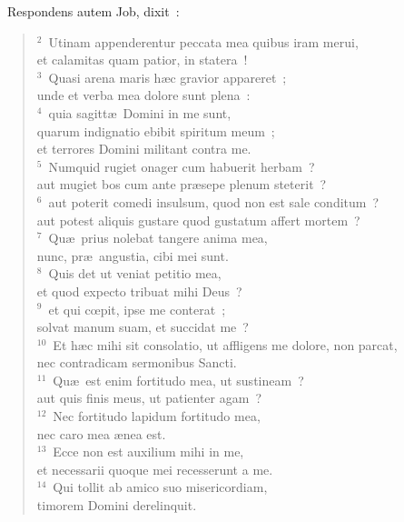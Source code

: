 ~\lettrine[lines=10,image=true,loversize=0.05,lraise=-0.03]{R}{}espondens autem Job, dixit~:
\begin{flushleft}\begin{verse}\vspace{6pt}${}^{2}$~Utinam appenderentur peccata mea quibus iram merui,\\ et calamitas quam patior, in statera~!\\
${}^{3}$~Quasi arena maris h\ae c gravior appareret~;\\ unde et verba mea dolore sunt plena~:\\
${}^{4}$~quia sagitt\ae\ Domini in me sunt,\\ quarum indignatio ebibit spiritum meum~;\\ et terrores Domini militant contra me.\\
${}^{5}$~Numquid rugiet onager cum habuerit herbam~?\\ aut mugiet bos cum ante pr\ae sepe plenum steterit~?\\
${}^{6}$~aut poterit comedi insulsum, quod non est sale conditum~?\\ aut potest aliquis gustare quod gustatum affert mortem~?\\
${}^{7}$~Qu\ae\ prius nolebat tangere anima mea,\\ nunc, pr\ae\ angustia, cibi mei sunt.\\
${}^{8}$~Quis det ut veniat petitio mea,\\ et quod expecto tribuat mihi Deus~?\\
${}^{9}$~et qui cœpit, ipse me conterat~;\\ solvat manum suam, et succidat me~?\\
${}^{10}$~Et h\ae c mihi sit consolatio, ut affligens me dolore, non parcat,\\ nec contradicam sermonibus Sancti.\\
${}^{11}$~Qu\ae\ est enim fortitudo mea, ut sustineam~?\\ aut quis finis meus, ut patienter agam~?\\
${}^{12}$~Nec fortitudo lapidum fortitudo mea,\\ nec caro mea \ae nea est.\\
${}^{13}$~Ecce non est auxilium mihi in me,\\ et necessarii quoque mei recesserunt a me.\\
${}^{14}$~Qui tollit ab amico suo misericordiam,\\ timorem Domini derelinquit.\\

\end{verse}
\end{flushleft}

